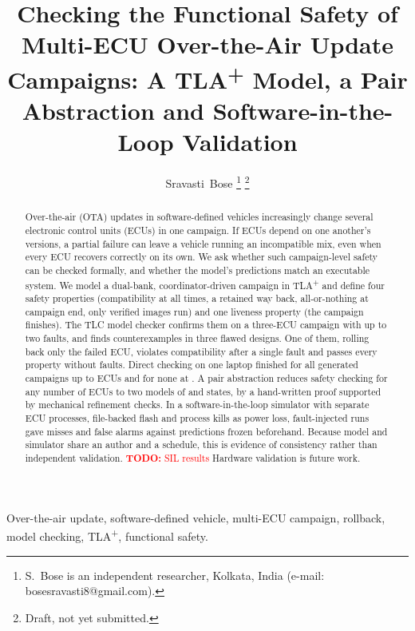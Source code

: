\documentclass[journal]{IEEEtran}
\newcommand{\todo}[1]{\textcolor{red}{\textbf{TODO:} #1}}
\newcommand{\tla}{TLA\textsuperscript{+}}
\begin{document}
\title{Checking the Functional Safety of Multi-ECU Over-the-Air Update Campaigns: A \tla{} Model, a Pair Abstraction and Software-in-the-Loop Validation}

\author{Sravasti~Bose%
\thanks{S.~Bose is an independent researcher, Kolkata, India (e-mail: bosesravasti8@gmail.com).}%
\thanks{Draft, not yet submitted.}}


\maketitle

\begin{abstract}
Over-the-air (OTA) updates in software-defined vehicles increasingly change several electronic control units (ECUs) in one campaign. If ECUs depend on one another's versions, a partial failure can leave a vehicle running an incompatible mix, even when every ECU recovers correctly on its own. We ask whether such campaign-level safety can be checked formally, and whether the model's predictions match an executable system. We model a dual-bank, coordinator-driven campaign in \tla{} and define four safety properties (compatibility at all times, a retained way back, all-or-nothing at campaign end, only verified images run) and one liveness property (the campaign finishes). The TLC model checker confirms them on a three-ECU campaign with up to two faults, and finds counterexamples in three flawed designs. One of them, rolling back only the failed ECU, violates compatibility after a single fault and passes every property without faults. Direct checking on one laptop finished for all generated campaigns up to \ScaleAllFinishMax{} ECUs and for none at \ScaleFirstNone{}. A pair abstraction reduces safety checking for any number of ECUs to two models of \PairStatesNone{} and \PairStatesEdge{} states, by a hand-written proof supported by mechanical refinement checks. \ifsil In a software-in-the-loop simulator with separate ECU processes, file-backed flash and process kills as power loss, \SilRuns{} fault-injected runs gave \SilAllMiss{} misses and \SilAllFalseAlarm{} false alarms against predictions frozen beforehand. Because model and simulator share an author and a schedule, this is evidence of consistency rather than independent validation. \else \todo{SIL results}\fi{} Hardware validation is future work.
\end{abstract}

\begin{IEEEkeywords}
Over-the-air update, software-defined vehicle, multi-ECU campaign, rollback, model checking, \tla{}, functional safety.
\end{IEEEkeywords}
\end{document}
